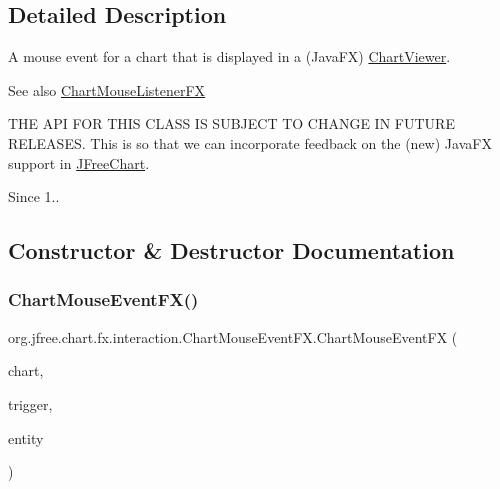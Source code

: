 \subsection{Detailed Description}
A mouse event for a chart that is displayed in a (Java\+FX) \mbox{\hyperlink{classorg_1_1jfree_1_1chart_1_1fx_1_1_chart_viewer}{Chart\+Viewer}}.

\begin{DoxySeeAlso}{See also}
\mbox{\hyperlink{interfaceorg_1_1jfree_1_1chart_1_1fx_1_1interaction_1_1_chart_mouse_listener_f_x}{Chart\+Mouse\+Listener\+FX}}
\end{DoxySeeAlso}


T\+HE A\+PI F\+OR T\+H\+IS C\+L\+A\+SS IS S\+U\+B\+J\+E\+CT TO C\+H\+A\+N\+GE IN F\+U\+T\+U\+RE R\+E\+L\+E\+A\+S\+ES. This is so that we can incorporate feedback on the (new) Java\+FX support in \mbox{\hyperlink{classorg_1_1jfree_1_1chart_1_1_j_free_chart}{J\+Free\+Chart}}.

\begin{DoxySince}{Since}
1.. 
\end{DoxySince}


\subsection{Constructor \& Destructor Documentation}
\mbox{\label{classorg_1_1jfree_1_1chart_1_1fx_1_1interaction_1_1_chart_mouse_event_f_x_a369c3e4f3d7e5ce3aec68a64e9ecc2af}} 
\subsubsection{\texorpdfstring{Chart\+Mouse\+Event\+F\+X()}{ChartMouseEventFX()}}
{\footnotesize\ttfamily org.\+jfree.\+chart.\+fx.\+interaction.\+Chart\+Mouse\+Event\+F\+X.\+Chart\+Mouse\+Event\+FX (\begin{DoxyParamCaption}\item[{\mbox{\hyperlink{classorg_1_1jfree_1_1chart_1_1_j_free_chart}{J\+Free\+Chart}}}]{chart,  }\item[{Mouse\+Event}]{trigger,  }\item[{\mbox{\hyperlink{classorg_1_1jfree_1_1chart_1_1entity_1_1_chart_entity}{Chart\+Entity}}}]{entity }\end{DoxyParamCaption})}

